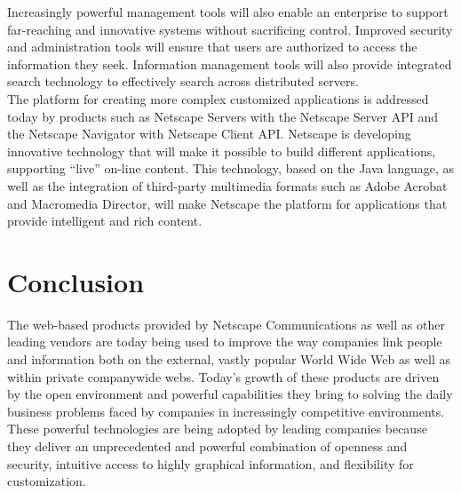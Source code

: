 Increasingly powerful management tools will also enable an enterprise
to support far-reaching and innovative systems without sacrificing
control. Improved security and administration tools will ensure that
users are authorized to access the information they seek. Information
management tools will also provide integrated search technology to
effectively search across distributed servers.\\

The platform for creating more complex customized applications is
addressed today by products such as Netscape Servers with the Netscape
Server API and the Netscape Navigator with Netscape Client API.
Netscape is developing innovative technology that will make it possible
to build different applications, supporting ``live'' on-line content.
This technology, based on the Java language, as well as the integration
of third-party multimedia formats such as Adobe Acrobat and Macromedia
Director, will make Netscape the platform for applications that provide
intelligent and rich content.


\section{Conclusion}

The web-based products provided by Netscape Communications as well as
other leading vendors are today being used to improve the way companies
link people and information both on the external, vastly popular World
Wide Web as well as within private companywide webs. Today's growth of
these products are driven by the open environment and powerful
capabilities they bring to solving the daily business problems faced by
companies in increasingly competitive environments. These powerful
technologies are being adopted by leading companies because they
deliver an unprecedented and powerful combination of openness and
security, intuitive access to highly graphical information, and
flexibility for customization.
